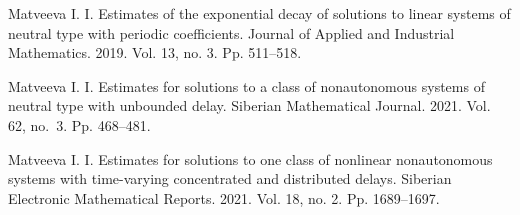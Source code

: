 \documentclass[12pt]{llncs}
\begin{document}


\begin{thebibliography}{9} %

Matveeva I. I. 
Estimates of the exponential decay of solutions to linear systems of 
neutral type with periodic coefficients.  
Journal of Applied and Industrial Mathematics. 2019. Vol. 13, no. 3. Pp. 511--518.

Matveeva I. I.
Estimates for solutions to a class of nonautonomous systems of neutral type 
with unbounded delay. Siberian Mathematical Journal. 2021. Vol. 62, no.~3. Pp. 468--481.

Matveeva I. I.
Estimates for solutions to one class of nonlinear nonautonomous systems with 
time-varying concentrated and distributed delays.   
Siberian Electronic Mathematical Reports. 2021. Vol. 18, no. 2. Pp. 1689--1697.

\end{thebibliography}
\end{document}
